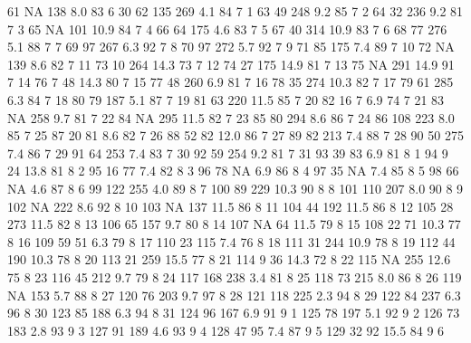 \documentclass{article}
\begin{document}
\begin{Schunk}
\begin{Soutput}
61     NA     138  8.0   83     6  30
62    135     269  4.1   84     7   1
63     49     248  9.2   85     7   2
64     32     236  9.2   81     7   3
65     NA     101 10.9   84     7   4
66     64     175  4.6   83     7   5
67     40     314 10.9   83     7   6
68     77     276  5.1   88     7   7
69     97     267  6.3   92     7   8
70     97     272  5.7   92     7   9
71     85     175  7.4   89     7  10
72     NA     139  8.6   82     7  11
73     10     264 14.3   73     7  12
74     27     175 14.9   81     7  13
75     NA     291 14.9   91     7  14
76      7      48 14.3   80     7  15
77     48     260  6.9   81     7  16
78     35     274 10.3   82     7  17
79     61     285  6.3   84     7  18
80     79     187  5.1   87     7  19
81     63     220 11.5   85     7  20
82     16       7  6.9   74     7  21
83     NA     258  9.7   81     7  22
84     NA     295 11.5   82     7  23
85     80     294  8.6   86     7  24
86    108     223  8.0   85     7  25
87     20      81  8.6   82     7  26
88     52      82 12.0   86     7  27
89     82     213  7.4   88     7  28
90     50     275  7.4   86     7  29
91     64     253  7.4   83     7  30
92     59     254  9.2   81     7  31
93     39      83  6.9   81     8   1
94      9      24 13.8   81     8   2
95     16      77  7.4   82     8   3
96     78      NA  6.9   86     8   4
97     35      NA  7.4   85     8   5
98     66      NA  4.6   87     8   6
99    122     255  4.0   89     8   7
100    89     229 10.3   90     8   8
101   110     207  8.0   90     8   9
102    NA     222  8.6   92     8  10
103    NA     137 11.5   86     8  11
104    44     192 11.5   86     8  12
105    28     273 11.5   82     8  13
106    65     157  9.7   80     8  14
107    NA      64 11.5   79     8  15
108    22      71 10.3   77     8  16
109    59      51  6.3   79     8  17
110    23     115  7.4   76     8  18
111    31     244 10.9   78     8  19
112    44     190 10.3   78     8  20
113    21     259 15.5   77     8  21
114     9      36 14.3   72     8  22
115    NA     255 12.6   75     8  23
116    45     212  9.7   79     8  24
117   168     238  3.4   81     8  25
118    73     215  8.0   86     8  26
119    NA     153  5.7   88     8  27
120    76     203  9.7   97     8  28
121   118     225  2.3   94     8  29
122    84     237  6.3   96     8  30
123    85     188  6.3   94     8  31
124    96     167  6.9   91     9   1
125    78     197  5.1   92     9   2
126    73     183  2.8   93     9   3
127    91     189  4.6   93     9   4
128    47      95  7.4   87     9   5
129    32      92 15.5   84     9   6

\end{Soutput}
\end{Schunk}
\end{document}
